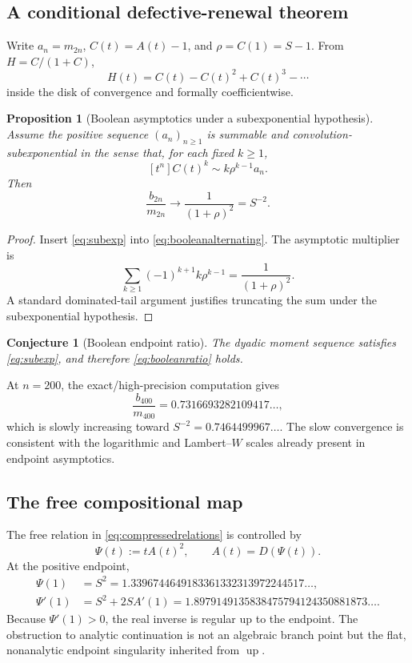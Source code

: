 \documentclass[11pt]{article}
\newtheorem{proposition}[theorem]{Proposition}
\newtheorem{conjecture}[theorem]{Conjecture}
\theoremstyle{definition}
\newcommand{\Up}{\operatorname{up}}
\begin{document}
\subsection{A conditional defective-renewal theorem}
Write \(a_n=m_{2n}\), \(C(t)=A(t)-1\), and \(\rho=C(1)=S-1\). From \(H=C/(1+C)\),
\begin{equation}\label{eq:booleanalternating}
H(t)=C(t)-C(t)^2+C(t)^3-\cdots
\end{equation}
inside the disk of convergence and formally coefficientwise.

\begin{proposition}[Boolean asymptotics under a subexponential hypothesis]\label{prop:booleanrenewal}
Assume the positive sequence \((a_n)_{n\ge1}\) is summable and convolution-subexponential in the sense that, for each fixed \(k\ge1\),
\begin{equation}\label{eq:subexp}
[t^n]C(t)^k\sim k\rho^{k-1}a_n.
\end{equation}
Then
\begin{equation}\label{eq:booleanratio}
\frac{b_{2n}}{m_{2n}}\longrightarrow\frac1{(1+\rho)^2}=S^{-2}.
\end{equation}
\end{proposition}
\begin{proof}
Insert \eqref{eq:subexp} into \eqref{eq:booleanalternating}. The asymptotic multiplier is
\[
\sum_{k\ge1}(-1)^{k+1}k\rho^{k-1}=\frac1{(1+\rho)^2}.
\]
A standard dominated-tail argument justifies truncating the sum under the subexponential hypothesis.
\end{proof}

\begin{conjecture}[Boolean endpoint ratio]\label{conj:booleanratio}
The dyadic moment sequence satisfies \eqref{eq:subexp}, and therefore \eqref{eq:booleanratio} holds.
\end{conjecture}
At \(n=200\), the exact/high-precision computation gives
\[
\frac{b_{400}}{m_{400}}=0.7316693282109417\ldots,
\]
which is slowly increasing toward \(S^{-2}=0.7464499967\ldots\). The slow convergence is consistent with the logarithmic and Lambert--\(W\) scales already present in endpoint asymptotics.

\subsection{The free compositional map}
The free relation in \eqref{eq:compressedrelations} is controlled by
\begin{equation}\label{eq:psimap}
\Psi(t):=tA(t)^2,
\qquad A(t)=D(\Psi(t)).
\end{equation}
At the positive endpoint,
\begin{align}
\Psi(1)&=S^2=1.3396744649183361332313972244517\ldots,\label{eq:Psi1}\\
\Psi'(1)&=S^2+2SA'(1)
=1.8979149135838475794124350881873\ldots.
\label{eq:Psiprime}
\end{align}
Because \(\Psi'(1)>0\), the real inverse is regular up to the endpoint. The obstruction to analytic continuation is not an algebraic branch point but the flat, nonanalytic endpoint singularity inherited from \(\Up\).
\end{document}
